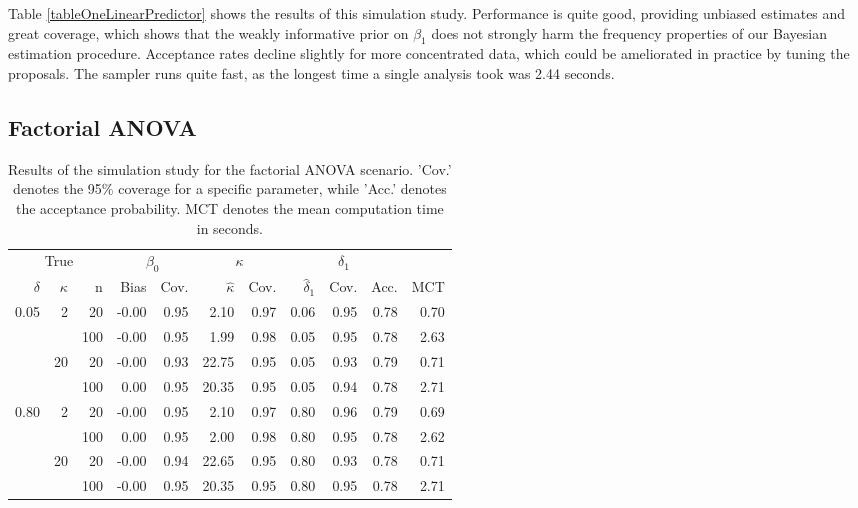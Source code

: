 \documentclass[11pt,a4paper]{article}\usepackage[]{graphicx}\usepackage[]{color}
\begin{document}
Table \ref{tableOneLinearPredictor} shows the results of this simulation study. Performance is quite good, providing unbiased estimates and great coverage, which shows that the weakly informative prior on \( \beta_1 \) does not strongly harm the frequency properties of our Bayesian estimation procedure. Acceptance rates decline slightly for more concentrated data, which could be ameliorated in practice by tuning the proposals. The sampler runs quite fast, as the longest time a single analysis took was 2.44 seconds.

\subsection{Factorial ANOVA}

\label{FacANOVA}

\begin{table}[btp]
\centering
\begin{small}
\caption{Results of the simulation study for the factorial ANOVA scenario. 'Cov.' denotes the 95\% coverage for a specific parameter, while 'Acc.' denotes the acceptance probability. MCT denotes the mean computation time in seconds.} 
\label{tableFacANOVA}
\begin{tabular}{rrrrrrrrrrr}
  \toprule \multicolumn{3}{c}{True} & \multicolumn{2}{c}{$\beta_0$} & \multicolumn{2}{c}{$\kappa$} & \multicolumn{3}{c}{$\delta_1$} & \\  \cmidrule(lr){1-3} \cmidrule(lr){4-5} \cmidrule(lr){6-7} \cmidrule(lr){8-10}$\delta$ & $\kappa$ & n & Bias & Cov. & $\hat{\kappa}$ & Cov. & $\hat{\delta}_1$ & Cov. & Acc. & MCT \\ 
  \midrule
0.05 & 2 & 20 & -0.00 & 0.95 & 2.10 & 0.97 & 0.06 & 0.95 & 0.78 & 0.70 \\ 
   \vspace{0.2cm}  &  & 100 & -0.00 & 0.95 & 1.99 & 0.98 & 0.05 & 0.95 & 0.78 & 2.63 \\ 
   & 20 & 20 & -0.00 & 0.93 & 22.75 & 0.95 & 0.05 & 0.93 & 0.79 & 0.71 \\ 
   \vspace{0.2cm}  &  & 100 & 0.00 & 0.95 & 20.35 & 0.95 & 0.05 & 0.94 & 0.78 & 2.71 \\ 
  0.80 & 2 & 20 & -0.00 & 0.95 & 2.10 & 0.97 & 0.80 & 0.96 & 0.79 & 0.69 \\ 
   \vspace{0.2cm}  &  & 100 & 0.00 & 0.95 & 2.00 & 0.98 & 0.80 & 0.95 & 0.78 & 2.62 \\ 
   & 20 & 20 & -0.00 & 0.94 & 22.65 & 0.95 & 0.80 & 0.93 & 0.78 & 0.71 \\ 
   &  & 100 & -0.00 & 0.95 & 20.35 & 0.95 & 0.80 & 0.95 & 0.78 & 2.71 \\ 
   \bottomrule
\end{tabular}
\end{small}
\end{table}
\end{document}
